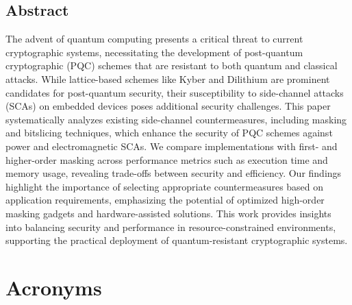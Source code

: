 \documentclass[a4paper,12pt,oneside,openany,headsepline,bibliography=totocnumbered]{scrbook}
\begin{document}


\section*{Abstract}
\thispagestyle{abstract}

The advent of quantum computing presents a critical threat to current cryptographic systems, necessitating the development of post-quantum cryptographic (PQC) schemes that are resistant to both quantum and classical attacks. While lattice-based schemes like Kyber and Dilithium are prominent candidates for post-quantum security, their susceptibility to side-channel attacks (SCAs) on embedded devices poses additional security challenges. This paper systematically analyzes existing side-channel countermeasures, including masking and bitslicing techniques, which enhance the security of PQC schemes against power and electromagnetic SCAs. We compare implementations with first- and higher-order masking across performance metrics such as execution time and memory usage, revealing trade-offs between security and efficiency. Our findings highlight the importance of selecting appropriate countermeasures based on application requirements, emphasizing the potential of optimized high-order masking gadgets and hardware-assisted solutions. This work provides insights into balancing security and performance in resource-constrained environments, supporting the practical deployment of quantum-resistant cryptographic systems.

\tableofcontents
\thispagestyle{contents}

\chapter*{Acronyms}
\thispagestyle{acronyms}
\begin{acronym}[PQC]
\end{acronym}






\newpage
\listoffigures
\thispagestyle{listsoffigures}

\listoftables
\thispagestyle{listoftables}

\newpage


\thispagestyle{bibliography}
\end{document}
